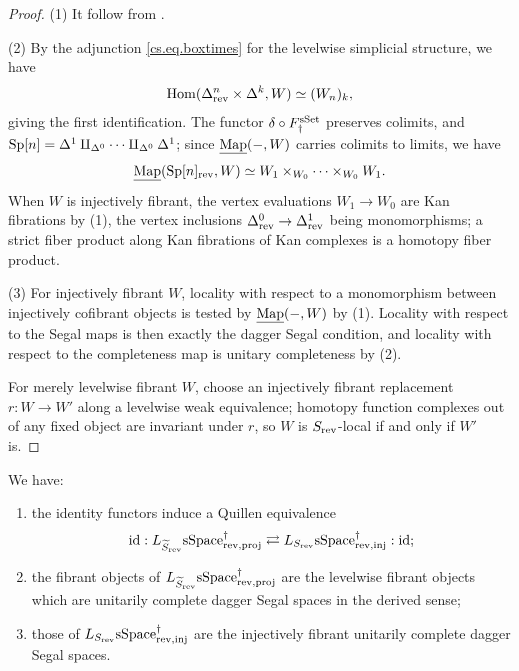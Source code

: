 \documentclass[a4paper,dvipdfmx,11pt]{amsart}
\begin{document}
\begin{proof}
  (1)
  It follow from \cite[\S9.1, \S17.2]{Hir02}.

  (2)
  By the adjunction \eqref{cs.eq.boxtimes} for the levelwise simplicial structure, we have 
  \begin{align}
    \operatorname{Hom}(\Delta^n_{\mathrm{rev}}\times\Delta^k,W)\simeq(W_n)_k,
  \end{align}
  giving the first identification.
  The functor $\delta\circ F_{\dag}^{\mathrm{sSet}}$ preserves colimits, and $\mathrm{Sp}[n]=\Delta^1\amalg_{\Delta^0}\cdots\amalg_{\Delta^0}\Delta^1$; 
  since $\underline{\operatorname{Map}}(-,W)$ carries colimits to limits, we have 
  \begin{align}
    \underline{\operatorname{Map}}(\mathrm{Sp}[n]_{\mathrm{rev}},W)\simeq W_1\times_{W_0}\cdots\times_{W_0}W_1.
  \end{align}
  When $W$ is injectively fibrant, the vertex evaluations $W_1\to W_0$ are Kan fibrations by (1), the vertex inclusions $\Delta^0_{\mathrm{rev}}\to\Delta^1_{\mathrm{rev}}$ being monomorphisms; a strict fiber product along Kan fibrations of Kan complexes is a homotopy fiber product.

  (3)
  For injectively fibrant $W$, locality with respect to a monomorphism between injectively cofibrant objects is tested by $\underline{\operatorname{Map}}(-,W)$ by (1).
  Locality with respect to the Segal maps is then exactly the dagger Segal condition, and locality with respect to the completeness map is unitary completeness by (2).
  
  For merely levelwise fibrant $W$, choose an injectively fibrant replacement $r:W\to W'$ along a levelwise weak equivalence; 
  homotopy function complexes out of any fixed object are invariant under $r$, so $W$ is $S_{\mathrm{rev}}$-local if and only if $W'$ is.
\end{proof}

\begin{proposition}\label{h1.lem.rev-models}
  We have:
  \begin{enumerate}
    \item the identity functors induce a Quillen equivalence
    \begin{align}
      \operatorname{id}:
      L_{\widetilde S_{\mathrm{rev}}}\mathrm{sSpace}^{\dag}_{\mathrm{rev},\mathrm{proj}}
      \rightleftarrows
      L_{S_{\mathrm{rev}}}\mathrm{sSpace}^{\dag}_{\mathrm{rev},\mathrm{inj}}
      :\operatorname{id};
    \end{align}
    \item the fibrant objects of $L_{\widetilde S_{\mathrm{rev}}}\mathrm{sSpace}^{\dag}_{\mathrm{rev},\mathrm{proj}}$ are the levelwise fibrant objects which are unitarily complete dagger Segal spaces in the derived sense;
    \item those of $L_{S_{\mathrm{rev}}}\mathrm{sSpace}^{\dag}_{\mathrm{rev},\mathrm{inj}}$ are the injectively fibrant unitarily complete dagger Segal spaces.
  \end{enumerate}
\end{proposition}
\end{document}

